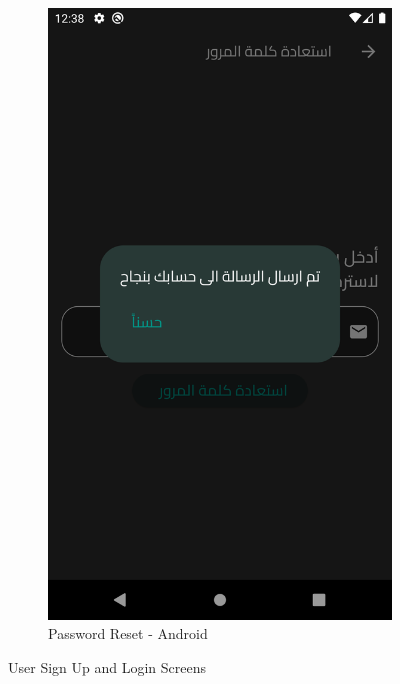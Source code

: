 \documentclass[a4paper, 12pt]{report} %
\begin{document}
\begin{figure}[H]
\begin{subfigure}{0.3\textwidth}
                    \includegraphics[width=0.8\linewidth, height=0.9\textheight, keepaspectratio]{Images/password_reset.png}
                    \caption{Password Reset - Android}
                    \label{fig:password_reset}
                \end{subfigure}
                \caption{User Sign Up and Login Screens}
                \label{fig:real_sign_up_login}
            \end{figure}
\end{document}
